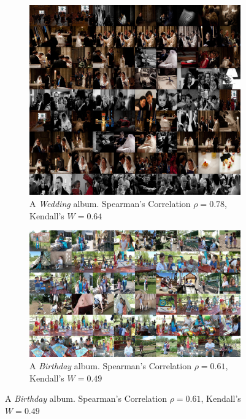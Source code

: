 \documentclass[10pt,twocolumn,letterpaper]{article}
\begin{document}
\begin{figure}[ht]
  \centering
\begin{subfigure}{0.49\textwidth}
  \includegraphics[width=\linewidth]{wedding_canvas}
  \caption{A \textit{Wedding} album. Spearman's Correlation $\rho = 0.78$, Kendall's $W = 0.64$}
  \label{wedding_album}
\end{subfigure}
\begin{subfigure}{0.49\textwidth}
  \includegraphics[width=\linewidth]{birthday_canvas}
  \caption{A \textit{Birthday} album. Spearman's Correlation $\rho = 0.61$, Kendall's $W = 0.49$}
  \label{birthday_album}
\end{subfigure}

\end{figure}
\end{document}
